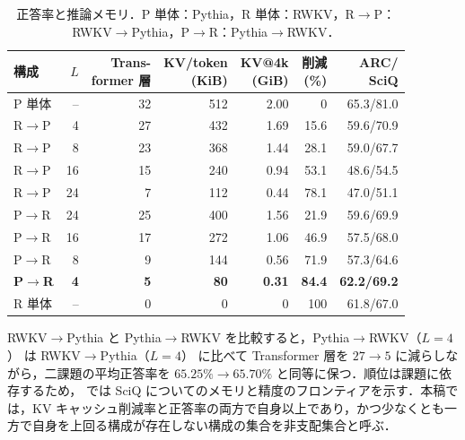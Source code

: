 \documentclass[techrep,noauthor]{ipsj}
\newcommand{\rev}[1]{{\color{blue}#1}}
\newcommand{\revr}[1]{{\color{red}#1}}
\newcommand{\revp}[1]{{\color{violet}#1}}
\newcommand{\RtoP}{\textsf{RWKV$\to$\allowbreak Pythia}}
\newcommand{\PtoR}{\textsf{Pythia$\to$\allowbreak RWKV}}
\newcommand{\RtoPL}[1]{\RtoP{}（$L{=}#1$）}
\newcommand{\PtoRL}[1]{\PtoR{}（$L{=}#1$）}
\begin{document}
\begin{table}[!t]\centering\small
\caption{\rev{正答率と推論メモリ．\revr{P 単体：Pythia，R 単体：RWKV，}R$\to$P：RWKV$\to$Pythia，P$\to$R：Pythia$\to$RWKV．}}\label{tab:kv}
\setlength{\tabcolsep}{2.4pt}
{\color{blue}
\begin{tabular}{lrrrrrr}\toprule
構成 & $L$ & \shortstack{Trans-\\former 層} & \shortstack{KV/token\\(KiB)} & \shortstack{KV@4k\\(GiB)} & \shortstack{削減\\(\%)} & \shortstack{ARC/\\SciQ}\\\midrule
P 単体 & -- & 32 & 512 & 2.00 & 0 & 65.3/81.0\\
\textsf{R$\to$P} & 4  & 27 & 432 & 1.69 & 15.6 & 59.6/70.9\\
\textsf{R$\to$P} & 8  & 23 & 368 & 1.44 & 28.1 & 59.0/67.7\\
\textsf{R$\to$P} & 16 & 15 & 240 & 0.94 & 53.1 & 48.6/54.5\\
\textsf{R$\to$P} & 24 &  7 & 112 & 0.44 & 78.1 & 47.0/51.1\\
\textsf{P$\to$R} & 24 & 25 & 400 & 1.56 & 21.9 & 59.6/69.9\\
\textsf{P$\to$R} & 16 & 17 & 272 & 1.06 & 46.9 & 57.5/68.0\\
\textsf{P$\to$R} & 8  &  9 & 144 & 0.56 & 71.9 & 57.3/64.6\\
\textbf{\textsf{P$\to$R}} & \textbf{4} & \textbf{5} & \textbf{80} & \textbf{0.31} & \textbf{84.4} & \textbf{62.2/69.2}\\
R 単体 & -- & 0 & 0 & 0 & 100 & 61.8/67.0\\\bottomrule
\end{tabular}}
\end{table}

\RtoP{} と \PtoR{} を比較すると，\PtoRL{4} は \RtoPL{4} に比べて Transformer 層を $27\to5$ に減らしながら，二課題の平均正答率を
$65.25\%\to65.70\%$ \revp{と同等に保つ}．\revr{順位は課題に依存するため， では SciQ についてのメモリと精度のフロンティアを示す．}\revp{本稿では，KV キャッシュ削減率と正答率の両方で自身以上であり，かつ少なくとも一方で自身を上回る構成が存在しない構成の集合を非支配集合と呼ぶ．}
\end{document}
